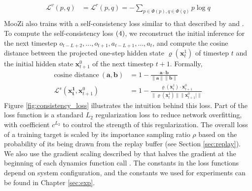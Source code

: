 \begin{align*}
    \mathcal{L}^v(p, q)  & = \mathcal{L}^r(p, q) = - \sum_{p \in \Phi(p), q \in \Phi(q)} p \log{q}  \\
\end{align*}
MooZi also trains with a self-consistency loss similar to that described by \citeauthor{MasteringAtariGames_Ye.Liu.ea_2021} and \citeauthor{VisualizingMuZeroModels_deVries.Voskuil.ea_2021} \cite{MasteringAtariGames_Ye.Liu.ea_2021,VisualizingMuZeroModels_deVries.Voskuil.ea_2021}.
To compute the self-consistency loss $(4)$, we reconstruct the initial inference for the next timestep \(o_{t-L+2}, \dots, o_{t+1}, a_{t-L+1}, \dots, a_{t}\), and compute the cosine distance between the projected one-step hidden state $\varrho(\mathbf{x}^1_t)$ of timestep $t$ and the initial hidden state $\mathbf{x}^0_{t+1}$ of the next timestep $t+1$.
Formally,
\begin{align*}
    \text{cosine distance} ~ (\mathbf{a}, \mathbf{b})
                                                                     & = 1 - \frac{\mathbf{a} \cdot \mathbf{b}}{\|\mathbf{a}\|\|\mathbf{b}\|}  \\
    \mathcal{L}^s(\mathbf{x^1_t}, \mathbf{x}^0_{t+1})  & = 1 - \frac{\varrho(\mathbf{x}^1_t) \cdot \mathbf{x}^0_{t+1}}{\|\varrho(\mathbf{x}^1_t)\| \| \mathbf{x}^0_{t+1}|\|}
\end{align*}
Figure \ref{fig:consistency_loss} illustrates the intuition behind this loss.
Part  of the loss function is a standard $L_2$ regularization loss to reduce network overfitting,
with coefficient $c^{L_2}$ to control the strength of this regularization.
The overall loss of a training target is scaled by its importance sampling ratio $\rho$ based on the probability of its being drawn from the replay buffer (see Section \ref{sec:replay}).
We also use the gradient scaling described by \citeauthor{MasteringAtariGo_Schrittwieser.Antonoglou.ea_2020}
that halves the gradient at the beginning of each dynamics function call \cite{MasteringAtariGo_Schrittwieser.Antonoglou.ea_2020}.
The constants in the loss functions depend on system configuration, and the constants we used for experiments can be found in Chapter \ref{sec:exp}.

